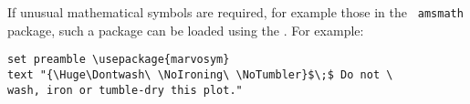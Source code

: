 \begin{center}
\end{center}

If unusual mathematical symbols are required, for example those in the {\tt
amsmath} package, such a package
can be loaded using the . For example:

\begin{verbatim}
set preamble \usepackage{marvosym}
text "{\Huge\Dontwash\ \NoIroning\ \NoTumbler}$\;$ Do not \
wash, iron or tumble-dry this plot."
\end{verbatim}

\begin{center}
\end{center}

